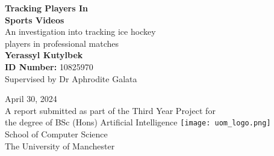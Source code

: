 \documentclass[12pt, letterpaper]{article}
\begin{document}
\begin{center}
    \Huge\textbf{Tracking Players In \\ Sports Videos} \\[12pt]
    \Large{An investigation into tracking ice hockey \\ players in professional matches} \\[55pt]
    \huge\textbf{Yerassyl Kutylbek} \\[6pt]
    \Large\textbf{ID Number:} {10825970} \\[5pt]
    \Large{Supervised by Dr Aphrodite Galata} \\[5pt]
    \date\Large{April 30, 2024} \\[90pt]

    \large{A report submitted as part of the Third Year Project for} \\[3pt]
    \large{the degree of BSc (Hons) Artificial Intelligence}
    \centering
    \texttt{[image: uom\_logo.png]} \\
    \large{School of Computer Science} \\[5pt]
    \large{The University of Manchester}
\end{center}

\tableofcontents
\newpage

\hypertarget{listoftables}{}
\listoftables
\newpage

\hypertarget{listoffigures}{}
\listoffigures
\newpage

\end{document}
